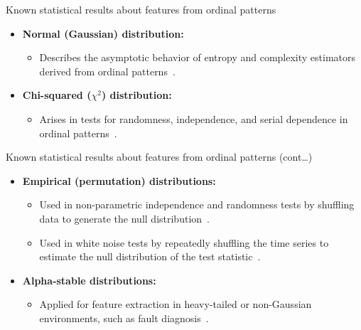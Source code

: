 \documentclass{beamer}
\begin{document}

\begin{frame}{Known statistical results about features from ordinal patterns}
	\begin{itemize}
		\item \textbf{Normal (Gaussian) distribution:}
		\begin{itemize}
			\item Describes the asymptotic behavior of entropy and complexity estimators derived from ordinal patterns~\cite{Davalos2019a, Rey2023a, Rey2025}.
		\end{itemize}
		\item \textbf{Chi-squared ($\chi^2$) distribution:}
		\begin{itemize}
			\item Arises in tests for randomness, independence, and serial dependence in ordinal patterns~\cite{Chagas2022, YamashitaRiosDeSousa2022, Rey2023, Rey2024, Shternshis2024, Shternshis2025}.
		\end{itemize}
	\end{itemize}
\end{frame}

\begin{frame}{Known statistical results about features from ordinal patterns (cont\dots)}
	\begin{itemize}
		\item \textbf{Empirical (permutation) distributions:}
		\begin{itemize}
			\item Used in non-parametric independence and randomness tests by shuffling data to generate the null distribution~\cite{MatillaGarcia2008, AshtariNezhad2019}.
			\item Used in white noise tests by repeatedly shuffling the time series to estimate the null distribution of the test statistic~\cite{Chagas2022a}.
		\end{itemize}
		\item \textbf{Alpha-stable distributions:}
		\begin{itemize}
			\item Applied for feature extraction in heavy-tailed or non-Gaussian environments, such as fault diagnosis~\cite{Chouri2014}.
		\end{itemize}
	\end{itemize}
\end{frame}
\end{document}
